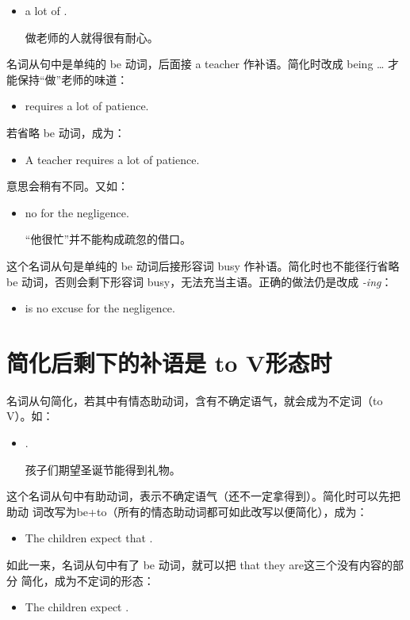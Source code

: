 \begin{itemize}
\item {}  a lot of .

  做老师的人就得很有耐心。
\end{itemize}
名词从句中是单纯的 be 动词，后面接 a teacher 作补语。简化时改成
being \ldots{} 才能保持“做”老师的味道：
\begin{itemize}
\item {} requires a lot of patience.
\end{itemize}
若省略 be 动词，成为：
\begin{itemize}
\item   A teacher requires a lot of patience.
\end{itemize}
意思会稍有不同。又如：
\begin{itemize}
\item {}  no  for the negligence.

  “他很忙”并不能构成疏忽的借口。
\end{itemize}
这个名词从句是单纯的 be 动词后接形容词 busy 作补语。简化时也不能径行省略
be 动词，否则会剩下形容词 busy，无法充当主语。正确的做法仍是改成 \emph{-ing}：
\begin{itemize}
\item {} is no excuse for the negligence.
\end{itemize}

\section{简化后剩下的补语是 to V形态时}

名词从句简化，若其中有情态助动词，含有不确定语气，就会成为不定词（to
V）。如：
\begin{itemize}
\item {}  .

  孩子们期望圣诞节能得到礼物。
\end{itemize}
这个名词从句中有助动词，表示不确定语气（还不一定拿得到）。简化时可以先把助动
词改写为be+to（所有的情态助动词都可如此改写以便简化），成为：
\begin{itemize}
\item The children expect that .
\end{itemize}
如此一来，名词从句中有了 be 动词，就可以把 that they are这三个没有内容的部分
简化，成为不定词的形态：
\begin{itemize}
\item   The children expect .
\end{itemize}

